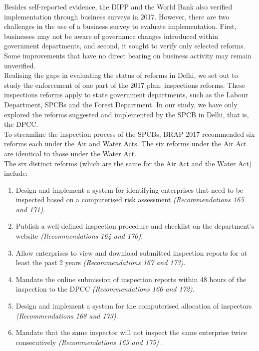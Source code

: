 \documentclass[a4paper, 12pt]{article}
\begin{document}
                 Besides self-reported evidence, the DIPP and the World Bank also verified implementation through business surveys in 2017. However, there are two challenges in the use of a business survey to evaluate implementation. First, businesses may not be aware of governance changes introduced within government departments, and second, it sought to verify only selected reforms. Some improvements that have no direct bearing on business activity may remain unverified. \\
                 
                 Realising the gaps in evaluating the status of reforms in Delhi, we set out to study the enforcement of one part of the 2017 plan: inspections reforms. These inspections reforms apply to state government departments, such as the Labour Department, SPCBs and the Forest Department. In our study, we have only explored the reforms suggested and implemented by the SPCB in Delhi, that is, the DPCC. \\
                 
                 To streamline the inspection process of the SPCBs, BRAP 2017 recommended six reforms each under the Air and Water Acts. The six reforms under the Air Act are identical to those under the Water Act. \\
                 
                 The six distinct reforms (which are the same for the Air Act and the Water Act) include: 
                 
                 \begin{enumerate}
                 \item Design and implement a system for identifying enterprises that need to be inspected based on a computerised risk assessment \textit{(Recommendations 165 and 171)}.
                 \item Publish a well-defined inspection procedure and checklist on the department’s website \textit{(Recommendations 164 and 170)}.
                 \item Allow enterprises to view and download submitted inspection reports for at least the past 2 years \textit{(Recommendations 167 and 173)}.
                 \item Mandate the online submission of inspection reports within 48 hours of the inspection to the DPCC \textit{(Recommendations 166 and 172)}.
                 \item Design and implement a system for the computerised allocation of inspectors \textit{(Recommendations 168 and 173)}.
                 \item Mandate that the same inspector will not inspect the same enterprise twice consecutively \textit{(Recommendations 169 and 175)} \parencite{DIPPa}.
                 \end{enumerate}
                 
\end{document}
